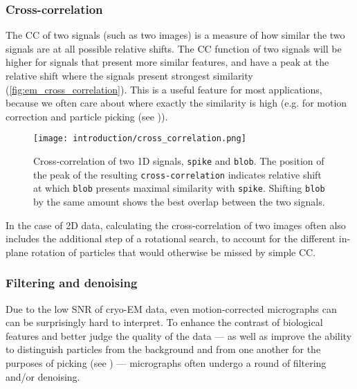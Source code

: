\subsubsection{Cross-correlation}\label{em_cross_correlation}

The CC of two signals (such as two images) is a measure of how similar the two signals are at all possible relative shifts.
The CC function of two signals will be higher for signals that present more similar features, and have a peak at the relative shift where the signals present strongest similarity (\autoref{fig:em_cross_correlation}).
This is a useful feature for most applications, because we often care about where exactly the similarity is high (e.g. for motion correction and particle picking (see )).

\begin{figure}[ht]
    \centering
    \texttt{[image: introduction/cross\_correlation.png]}
    \caption[Cross-correlation of 1D signals]{Cross-correlation of two 1D signals, \texttt{spike} and \texttt{blob}. The position of the peak of the resulting \texttt{cross-correlation} indicates relative shift at which \texttt{blob} presents maximal similarity with \texttt{spike}. Shifting \texttt{blob} by the same amount shows the best overlap between the two signals.}
    \label{fig:em_cross_correlation}
\end{figure}

In the case of 2D data, calculating the cross-correlation of two images often also includes the additional step of a rotational search, to account for the different in-plane rotation of particles that would otherwise be missed by simple CC.

\subsubsection{Filtering and denoising}\label{em_filtering_and_denoising}

Due to the low SNR of cryo-EM data, even motion-corrected micrographs can can be surprisingly hard to interpret.
To enhance the contrast of biological features and better judge the quality of the data --- as well as improve the ability to distinguish particles from the background and from one another for the purposes of picking (see ) --- micrographs often undergo a round of filtering and/or denoising.

